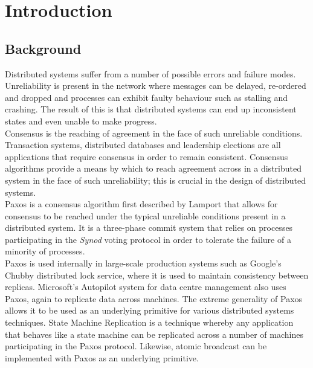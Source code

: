 \chapter{Introduction}

\section{Background}

Distributed systems suffer from a number of possible errors and failure modes. Unreliability is present in the network where messages can be delayed, re-ordered and dropped and processes can exhibit faulty behaviour such as stalling and crashing. The result of this is that distributed systems can end up inconsistent states and even unable to make progress. \\

Consensus is the reaching of agreement in the face of such unreliable conditions. Transaction systems, distributed databases and leadership elections are all applications that require consensus in order to remain consistent. Consensus algorithms provide a means by which to reach agreement across in a distributed system in the face of such unreliability; this is crucial in the design of distributed systems. \\

Paxos is a consensus algorithm first described by Lamport \cite{Lamport:1998:PP:279227.279229} that allows for consensus to be reached under the typical unreliable conditions present in a distributed system. It is a three-phase commit system that relies on processes participating in the \emph{Synod} voting protocol in order to tolerate the failure of a minority of processes. \\

Paxos is used internally in large-scale production systems such as Google's Chubby \cite{Burrows:2006:CLS:1298455.1298487} distributed lock service, where it is used to maintain consistency between replicas. Microsoft's Autopilot \cite{autopilot-automatic-data-center-management} system for data centre management also uses Paxos, again to replicate data across machines. The extreme generality of Paxos allows it to be used as an underlying primitive for various distributed systems techniques. State Machine Replication \cite{Schneider:1990:IFS:98163.98167} is a technique whereby any application that behaves like a state machine can be replicated across a number of machines participating in the Paxos protocol. Likewise, atomic broadcast \cite{Rodrigues:2003:ABA:942591.942742} can be implemented with Paxos as an underlying primitive. \\

